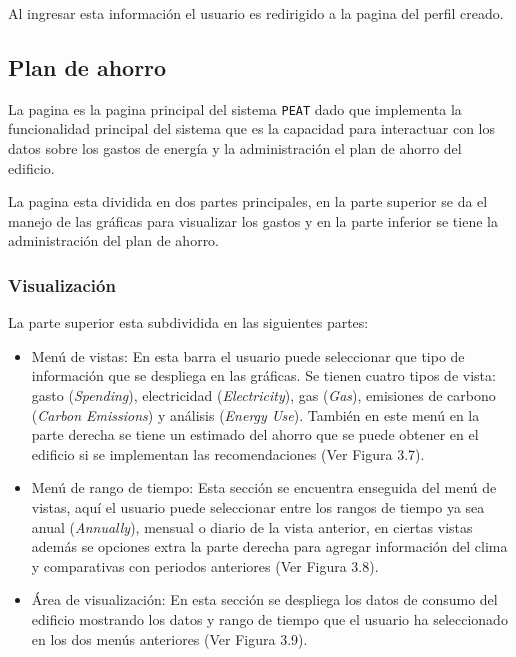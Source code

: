 Al ingresar esta información el usuario es redirigido a la pagina
 del perfil creado.

\subsection{Plan de ahorro}

La pagina  es la pagina principal del sistema
\texttt{PEAT} dado que implementa la funcionalidad principal del sistema
que es la capacidad para interactuar con los datos sobre los gastos de
energía y la administración el plan de ahorro del edificio.

La pagina esta dividida en dos partes principales, en la parte superior
se da el manejo de las gráficas para visualizar los gastos y en la parte
inferior se tiene la administración del plan de ahorro.

\subsubsection{Visualización}

La parte superior esta subdividida en las siguientes partes:
\begin{itemize}
\item Menú de vistas: En esta barra el usuario puede seleccionar
  que tipo de información que se despliega en las gráficas. Se tienen cuatro tipos
  de vista: gasto (\textit{Spending}), electricidad (\textit{Electricity}), gas
  (\textit{Gas}), emisiones de carbono (\textit{Carbon Emissions}) y análisis
  (\textit{Energy Use}). También en este menú en la parte derecha se
  tiene un estimado del ahorro que se puede obtener en el edificio
  si se implementan las recomendaciones (Ver Figura 3.7).
\item Menú de rango de tiempo: Esta sección se encuentra enseguida del menú de
  vistas, aquí el usuario puede seleccionar entre los rangos de tiempo ya sea anual
  (\textit{Annually}), mensual o diario de la vista anterior, en ciertas vistas
  además se opciones extra la parte derecha para agregar información del clima y
  comparativas con periodos anteriores (Ver Figura 3.8).
\item Área de visualización: En esta sección se despliega los datos de consumo
  del edificio mostrando los datos y rango de tiempo que el usuario ha seleccionado
  en los dos menús anteriores (Ver Figura 3.9).
\end{itemize}

